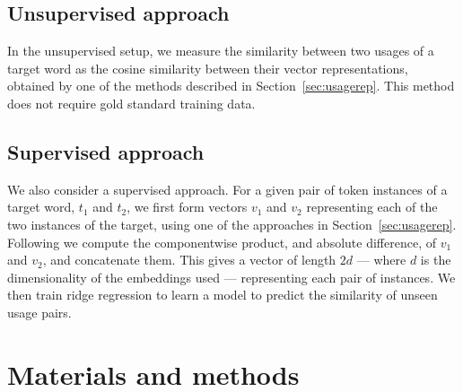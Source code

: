 \documentclass[11pt]{article}
\newcommand\glove{GloVe\xspace}
\newcommand{\secref}[1]{Section~\ref{#1}}
\begin{document}

\subsection{Unsupervised approach}


In the unsupervised setup, we measure the similarity between two
usages of a target word as the cosine similarity between their vector
representations, obtained by one of the methods described in
\secref{sec:usagerep}. This method does not require gold standard
training data.



\subsection{Supervised approach}

We also consider a supervised approach. For a given pair of token
instances of a target word, $t_1$ and $t_2$, we first form vectors
$v_1$ and $v_2$ representing each of the two instances of the target,
using one of the approaches in \secref{sec:usagerep}. Following
\cite{Tai+:2015} we compute the componentwise product, and absolute
difference, of $v_1$ and $v_2$, and concatenate them. This gives a
vector of length $2d$ --- where $d$ is the dimensionality of the
embeddings used --- representing each pair of instances. We then train
ridge regression to learn a model to predict the similarity of unseen
usage pairs.




\section{Materials and methods\label{sec:mandm}}
\end{document}
